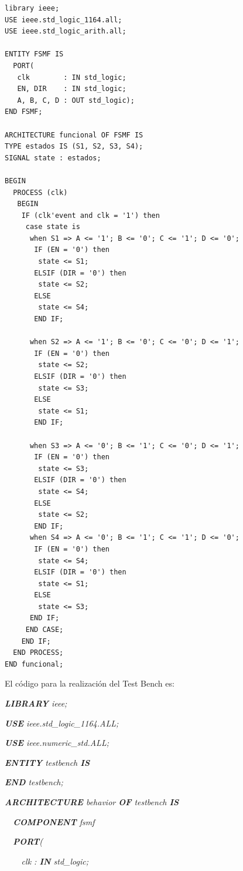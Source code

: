 \begin{lstlisting}
library ieee;
USE ieee.std_logic_1164.all;
USE ieee.std_logic_arith.all;

ENTITY FSMF IS
  PORT(
   clk        : IN std_logic;
   EN, DIR    : IN std_logic;
   A, B, C, D : OUT std_logic);
END FSMF;

ARCHITECTURE funcional OF FSMF IS
TYPE estados IS (S1, S2, S3, S4);
SIGNAL state : estados;

BEGIN
  PROCESS (clk)
   BEGIN
    IF (clk'event and clk = '1') then
     case state is
      when S1 => A <= '1'; B <= '0'; C <= '1'; D <= '0';
       IF (EN = '0') then
        state <= S1;
       ELSIF (DIR = '0') then
        state <= S2;
       ELSE
        state <= S4;
       END IF;

      when S2 => A <= '1'; B <= '0'; C <= '0'; D <= '1';
       IF (EN = '0') then
        state <= S2;
       ELSIF (DIR = '0') then
        state <= S3;
       ELSE
        state <= S1;
       END IF;

      when S3 => A <= '0'; B <= '1'; C <= '0'; D <= '1';
       IF (EN = '0') then
        state <= S3;
       ELSIF (DIR = '0') then
        state <= S4;
       ELSE
        state <= S2;
       END IF;
      when S4 => A <= '0'; B <= '1'; C <= '1'; D <= '0';
       IF (EN = '0') then
        state <= S4;
       ELSIF (DIR = '0') then
        state <= S1;
       ELSE
        state <= S3;
      END IF;
     END CASE;
    END IF;
  END PROCESS;
END funcional;
\end{lstlisting}







{
El código para la realización del Test Bench es:}

{\itshape
\textbf{LIBRARY} ieee;}

{\itshape
\textbf{USE} ieee.std\_logic\_1164.ALL;}

{\itshape
\textbf{USE} ieee.numeric\_std.ALL;}

{\itshape
\textbf{ENTITY} testbench \textbf{IS}}

{\itshape
\textbf{END} testbench;}

{\itshape
\textbf{ARCHITECTURE} behavior \textbf{OF} testbench \textbf{IS} }

{\itshape
\ \ \textbf{COMPONENT} fsmf}

{\itshape
\ \ \textbf{PORT}(}

{\itshape
\ \ \ \ clk : \textbf{IN} std\_logic;}


